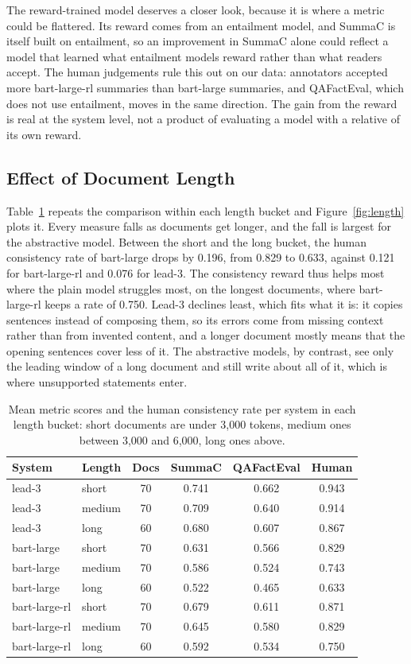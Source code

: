 The reward-trained model deserves a closer look, because it is where a metric could be flattered. Its reward comes from an entailment model, and SummaC is itself built on entailment, so an improvement in SummaC alone could reflect a model that learned what entailment models reward rather than what readers accept. The human judgements rule this out on our data: annotators accepted more bart-large-rl summaries than bart-large summaries, and QAFactEval, which does not use entailment, moves in the same direction. The gain from the reward is real at the system level, not a product of evaluating a model with a relative of its own reward.

\subsection{Effect of Document Length}
Table~\ref{tab:ablation_results} repeats the comparison within each length bucket and Figure~\ref{fig:length} plots it. Every measure falls as documents get longer, and the fall is largest for the abstractive model. Between the short and the long bucket, the human consistency rate of bart-large drops by 0.196, from 0.829 to 0.633, against 0.121 for bart-large-rl and 0.076 for lead-3. The consistency reward thus helps most where the plain model struggles most, on the longest documents, where bart-large-rl keeps a rate of 0.750. Lead-3 declines least, which fits what it is: it copies sentences instead of composing them, so its errors come from missing context rather than from invented content, and a longer document mostly means that the opening sentences cover less of it. The abstractive models, by contrast, see only the leading window of a long document and still write about all of it, which is where unsupported statements enter.

\begin{table}[t]
\centering
\caption{Mean metric scores and the human consistency rate per system in each length bucket: short documents are under 3,000 tokens, medium ones between 3,000 and 6,000, long ones above.}
\label{tab:ablation_results}
\begin{tabular}{llcccc}
\toprule
System & Length & Docs & SummaC & QAFactEval & Human \\
\midrule
lead-3 & short & 70 & 0.741 & 0.662 & 0.943 \\
lead-3 & medium & 70 & 0.709 & 0.640 & 0.914 \\
lead-3 & long & 60 & 0.680 & 0.607 & 0.867 \\
bart-large & short & 70 & 0.631 & 0.566 & 0.829 \\
bart-large & medium & 70 & 0.586 & 0.524 & 0.743 \\
bart-large & long & 60 & 0.522 & 0.465 & 0.633 \\
bart-large-rl & short & 70 & 0.679 & 0.611 & 0.871 \\
bart-large-rl & medium & 70 & 0.645 & 0.580 & 0.829 \\
bart-large-rl & long & 60 & 0.592 & 0.534 & 0.750 \\
\bottomrule
\end{tabular}
\end{table}

